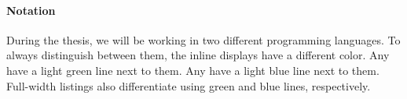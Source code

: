 \documentclass[thesis.tex]{subfiles}
\begin{document}
\paragraph{Notation}
During the thesis, we will be working in two different programming languages. To always distinguish between them, the inline displays have a different color. Any  have a light green line next to them. Any  have a light blue line next to them. Full-width listings also differentiate using green and blue lines, respectively.
\end{document}
